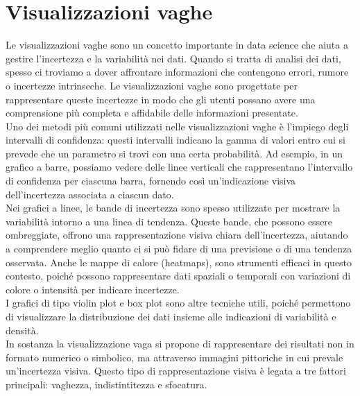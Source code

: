 \section{Visualizzazioni vaghe}
\label{sec:visualizzazione-vaghe}
Le visualizzazioni vaghe sono un concetto importante in data science che aiuta a gestire l'incertezza e la variabilità nei dati. Quando si tratta di analisi dei dati, spesso ci troviamo a dover affrontare informazioni che contengono errori, rumore o incertezze intrinseche. Le visualizzazioni vaghe sono progettate per rappresentare queste incertezze in modo che gli utenti possano avere una comprensione più completa e affidabile delle informazioni presentate.\\
Uno dei metodi più comuni utilizzati nelle visualizzazioni vaghe è l'impiego degli intervalli di confidenza: questi intervalli indicano la gamma di valori entro cui si prevede che un parametro si trovi con una certa probabilità. Ad esempio, in un grafico a barre, possiamo vedere delle linee verticali che rappresentano l'intervallo di confidenza per ciascuna barra, fornendo così un'indicazione visiva dell'incertezza associata a ciascun dato.\\
Nei grafici a linee, le bande di incertezza sono spesso utilizzate per mostrare la variabilità intorno a una linea di tendenza. Queste bande, che possono essere ombreggiate, offrono una rappresentazione visiva chiara dell'incertezza, aiutando a comprendere meglio quanto ci si può fidare di una previsione o di una tendenza osservata. Anche le mappe di calore (heatmaps), sono strumenti efficaci in questo contesto, poiché possono rappresentare dati spaziali o temporali con variazioni di colore o intensità per indicare incertezze.\\
I grafici di tipo violin plot e box plot sono altre tecniche utili, poiché permettono di visualizzare la distribuzione dei dati insieme alle indicazioni di variabilità e densità.\\
In sostanza la visualizzazione vaga si propone di rappresentare dei risultati non in formato numerico o simbolico, ma attraverso immagini pittoriche in cui prevale un'incertezza visiva. Questo tipo di rappresentazione visiva è legata a tre fattori principali: vaghezza, indistintitezza e sfocatura. \\

